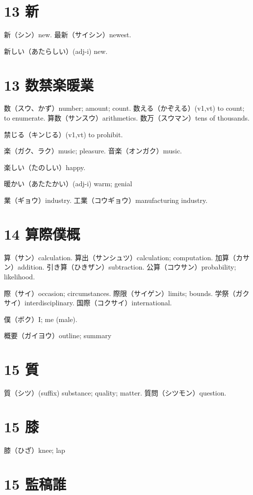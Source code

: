 \section{13 新}

新（シン）new.
最新（サイシン）newest.

新しい（あたらしい）(adj-i) new.

\section{13 数禁楽暖業}

数（スウ、かず）number; amount; count.
数える（かぞえる）(v1,vt) to count; to enumerate.
算数（サンスウ）arithmetics.
数万（スウマン）tens of thousands.

禁じる（キンじる）(v1,vt) to prohibit.

楽（ガク、ラク）music; pleasure.
音楽（オンガク）music.

楽しい（たのしい）happy.

暖かい（あたたかい）(adj-i) warm; genial

業（ギョウ）industry.
工業（コウギョウ）manufacturing industry.

\section{14 算際僕概}

算（サン）calculation.
算出（サンシュツ）calculation; computation.
加算（カサン）addition.
引き算（ひきザン）subtraction.
公算（コウサン）probability; likelihood.

際（サイ）occasion; circumstances.
際限（サイゲン）limits; bounds.
学祭（ガクサイ）interdisciplinary.
国際（コクサイ）international.

僕（ボク）I; me (male).

概要（ガイヨウ）outline; summary

\section{15 質}

質（シツ）(suffix) substance; quality; matter.
質問（シツモン）question.

\section{15 膝}

膝（ひざ）knee; lap

\section{15 監稿誰}


